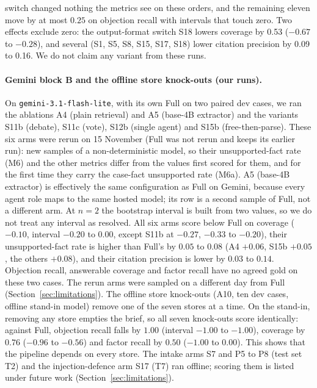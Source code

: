 switch changed nothing the metrics see on these orders, and the remaining eleven move by at most $0.25$ on objection recall with intervals that touch zero. Two effects exclude zero: the output-format switch S18 lowers coverage by 0.53 ($-0.67$ to $-0.28$), and several (S1, S5, S8, S15, S17, S18) lower citation precision by 0.09 to 0.16. We do not claim any variant from these runs.
\paragraph{Gemini block B and the offline store knock-outs (our runs).}  On \texttt{gemini-3.1-flash-lite}, with its own Full on two paired dev cases, we ran the ablations A4 (plain retrieval) and A5 (base-4B extractor) and the variants S11b (debate), S11c (vote), S12b (single agent) and S15b (free-then-parse). These six arms were rerun on 15 November (Full was not rerun and keeps its earlier run): new samples of a non-deterministic model, so their unsupported-fact rate (M6) and the other metrics differ from the values first scored for them, and for the first time they carry the case-fact unsupported rate (M6a). A5 (base-4B extractor) is effectively the same configuration as Full on Gemini, because every agent role maps to the same hosted model; its row is a second sample of Full, not a different arm. At $n=2$ the bootstrap interval is built from two values, so we do not treat any interval as resolved. All six arms score below Full on coverage ($-0.10$, interval $-0.20$ to $0.00$, except S11b at $-0.27$, $-0.33$ to $-0.20$), their unsupported-fact rate is higher than Full's by $0.05$ to $0.08$ (A4 $+0.06$, S15b $+0.05$, the others $+0.08$), and their citation precision is lower by $0.03$ to $0.14$. Objection recall, answerable coverage and factor recall have no agreed gold on these two cases. The rerun arms were sampled on a different day from Full (Section~\ref{sec:limitations}).  The offline store knock-outs (A10, ten dev cases, offline stand-in model) remove one of the seven stores at a time. On the stand-in, removing any store empties the brief, so all seven knock-outs score identically: against Full, objection recall falls by $1.00$ (interval $-1.00$ to $-1.00$), coverage by $0.76$ ($-0.96$ to $-0.56$) and factor recall by $0.50$ ($-1.00$ to $0.00$). This shows that the pipeline depends on every store. The intake arms S7 and P5 to P8 (test set T2) and the injection-defence arm S17 (T7) ran offline; scoring them is listed under future work (Section~\ref{sec:limitations}).

